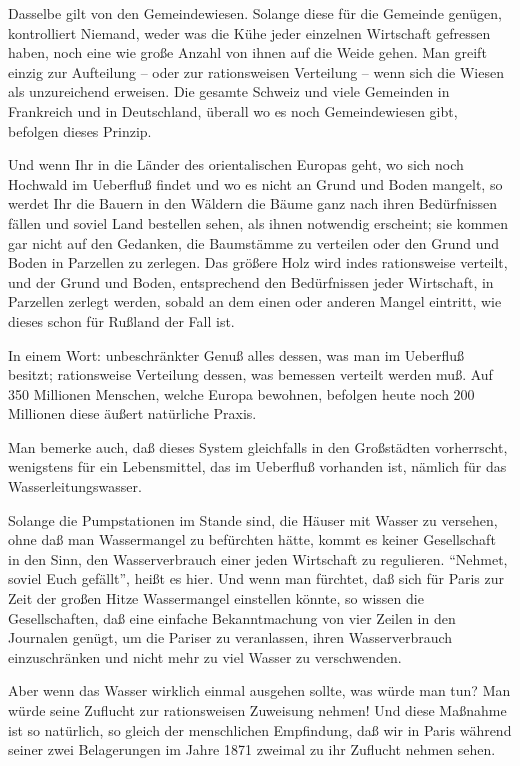 \documentclass{scrbook}
\begin{document}
Dasselbe gilt von den Gemeindewiesen. Solange diese für die Gemeinde genügen, kontrolliert Niemand, weder was die Kühe jeder einzelnen Wirtschaft gefressen haben, noch eine wie große Anzahl von ihnen auf die Weide gehen. Man greift einzig zur Aufteilung – oder zur rationsweisen Verteilung – wenn sich die Wiesen als unzureichend erweisen. Die gesamte Schweiz und viele Gemeinden in Frankreich und in Deutschland, überall wo es noch Gemeindewiesen gibt, befolgen dieses Prinzip.

Und wenn Ihr in die Länder des orientalischen Europas geht, wo sich noch Hochwald im Ueberfluß findet und wo es nicht an Grund und Boden mangelt, so werdet Ihr die Bauern in den Wäldern die Bäume ganz nach ihren Bedürfnissen fällen und soviel Land bestellen sehen, als ihnen notwendig erscheint; sie kommen gar nicht auf den Gedanken, die Baumstämme zu verteilen oder den Grund und Boden in Parzellen zu zerlegen. Das größere Holz wird indes rationsweise verteilt, und der Grund und Boden, entsprechend den Bedürfnissen jeder Wirtschaft, in Parzellen zerlegt werden, sobald an dem einen oder anderen Mangel eintritt, wie dieses schon für Rußland der Fall ist.

In einem Wort: unbeschränkter Genuß alles dessen, was man im Ueberfluß besitzt; rationsweise Verteilung dessen, was bemessen verteilt werden muß. Auf 350 Millionen Menschen, welche Europa bewohnen, befolgen heute noch 200 Millionen diese äußert natürliche Praxis.

Man bemerke auch, daß dieses System gleichfalls in den Großstädten vorherrscht, wenigstens für ein Lebensmittel, das im Ueberfluß vorhanden ist, nämlich für das Wasserleitungswasser.

Solange die Pumpstationen im Stande sind, die Häuser mit Wasser zu versehen, ohne daß man Wassermangel zu befürchten hätte, kommt es keiner Gesellschaft in den Sinn, den Wasserverbrauch einer jeden Wirtschaft zu regulieren. ``Nehmet, soviel Euch gefällt'', heißt es hier. Und wenn man fürchtet, daß sich für Paris zur Zeit der großen Hitze Wassermangel einstellen könnte, so wissen die Gesellschaften, daß eine einfache Bekanntmachung von vier Zeilen in den Journalen genügt, um die Pariser zu veranlassen, ihren Wasserverbrauch einzuschränken und nicht mehr zu viel Wasser zu verschwenden.

Aber wenn das Wasser wirklich einmal ausgehen sollte, was würde man tun? Man würde seine Zuflucht zur rationsweisen Zuweisung nehmen! Und diese Maßnahme ist so natürlich, so gleich der menschlichen Empfindung, daß wir in Paris während seiner zwei Belagerungen im Jahre 1871 zweimal zu ihr Zuflucht nehmen sehen.
\end{document}
